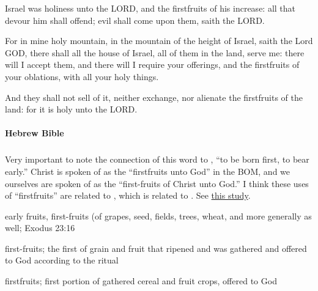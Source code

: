 \begin{compactdesc}
				\item[Jeremiah 2:3] Israel was holiness unto the LORD, and the firstfruits of his increase: all that devour him shall offend; evil shall come upon them, saith the LORD.
				\item[Ezekiel 20:40] For in mine holy mountain, in the mountain of the height of Israel, saith the Lord GOD, there shall all the house of Israel, all of them in the land, serve me: there will I accept them, and there will I require your offerings, and the firstfruits of your oblations, with all your holy things.
				\item[Ezekiel 48:14] And they shall not sell of it, neither exchange, nor alienate the firstfruits of the land: for it is holy unto the LORD.
			\end{compactdesc}
			
		\paragraph{Hebrew Bible}
			\label{FIRSTFRUITS-HEBREW}
		
			\subparagraph{\texorpdfstring{}{}}
				\label{BIKKURIM} %
				
				Very important to note the connection of this word to , ``to be born first, to bear early.'' Christ is spoken of as the ``firstfruits unto God'' in the BOM, and we ourselves are spoken of as the ``first-fruits of Christ unto God.'' I think these uses of ``firstfruits'' are related to , which is related to . See \hyperref[FIRSTFRUITS-UNTOGOD]{this study}.
			
				\begin{compactdesc}
					\item[HALOT 1204, PDF 583] \textbf{}
						\begin{compactitem}
							\item early fruits, first-fruits (of grapes, seed, fields, trees, wheat, and more generally as well; Exodus 23:16
						\end{compactitem}
					\item[BDB 1061, PDF 334] \textbf{}
						\begin{compactitem}
							\item first-fruits; the first of grain and fruit that ripened and was gathered and offered to God according to the ritual
						\end{compactitem}
					\item[DCH PDF 647] \textbf{}
						\begin{compactitem}
							\item firstfruits; first portion of gathered cereal and fruit crops, offered to God
						\end{compactitem}
				\end{compactdesc}
				
